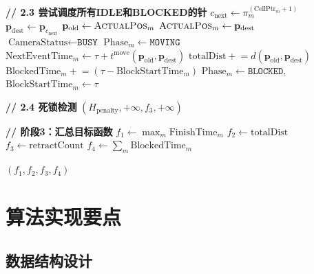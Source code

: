 \documentclass[11pt,a4paper]{article}
\begin{document}
\begin{algorithm}[H]
\begin{algorithmic}[1]
    \State \textbf{// 2.3 尝试调度所有IDLE和BLOCKED的针}
            \State $c_{\text{next}} \leftarrow \pi_m^{(\text{CellPtr}_m + 1)}$
            \State $\mathbf{p}_{\text{dest}} \leftarrow \mathbf{p}_{c_{\text{next}}}$
             
                \State $\mathbf{p}_{\text{old}} \leftarrow \textsc{ActualPos}_m$
                \State $\textsc{ActualPos}_m \leftarrow \mathbf{p}_{\text{dest}}$ 
                \State $\text{CameraStatus} \leftarrow \texttt{BUSY}$
                \State $\text{Phase}_m \leftarrow \texttt{MOVING}$
                \State $\text{NextEventTime}_m \leftarrow \tau + t^{\text{move}}(\mathbf{p}_{\text{old}}, \mathbf{p}_{\text{dest}})$
                \State $\text{totalDist} \mathrel{+}= d(\mathbf{p}_{\text{old}}, \mathbf{p}_{\text{dest}})$
                    \State $\text{BlockedTime}_m \mathrel{+}= (\tau - \text{BlockStartTime}_m)$
                \EndIf
            \Else
                    \State $\text{Phase}_m \leftarrow \texttt{BLOCKED}$, \; $\text{BlockStartTime}_m \leftarrow \tau$
                \EndIf
            \EndIf
        \EndIf
    \EndFor
    
    \State \textbf{// 2.4 死锁检测}
        \State \Return $(H_{\text{penalty}}, +\infty, f_3, +\infty)$
    \EndIf
\EndWhile

\State \textbf{// 阶段3：汇总目标函数}
\State $f_1 \leftarrow \max_{m} \text{FinishTime}_m$
\State $f_2 \leftarrow \text{totalDist}$
\State $f_3 \leftarrow \text{retractCount}$
\State $f_4 \leftarrow \sum_m \text{BlockedTime}_m$

\State \Return $(f_1, f_2, f_3, f_4)$
\end{algorithmic}
\end{algorithm}

\section{算法实现要点}

\subsection{数据结构设计}
\end{document}
